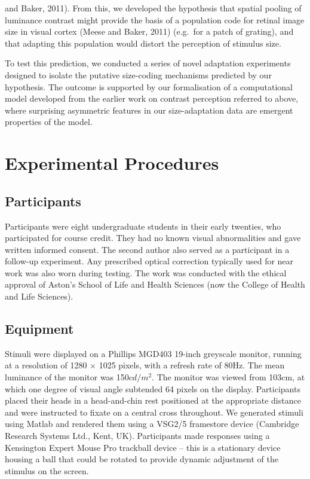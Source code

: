 \documentclass[
]{article}
\begin{document}
and Baker, 2011). From this, we developed the hypothesis that spatial pooling of luminance contrast might provide the basis of a population code for retinal image size in visual cortex (Meese and Baker, 2011) (e.g.~for a patch of grating), and that adapting this population would distort the perception of stimulus size.

To test this prediction, we conducted a series of novel adaptation experiments designed to isolate the putative size-coding mechanisms predicted by our hypothesis. The outcome is supported by our formalisation of a computational model developed from the earlier work on contrast perception referred to above, where surprising asymmetric features in our size-adaptation data are emergent properties of the model.

\hypertarget{experimental-procedures}{%
\section*{Experimental Procedures}\label{experimental-procedures}}

\hypertarget{participants}{%
\subsection*{Participants}\label{participants}}

Participants were eight undergraduate students in their early twenties, who participated for course credit. They had no known visual abnormalities and gave written informed consent. The second author also served as a participant in a follow-up experiment. Any prescribed optical correction typically used for near work was also worn during testing. The work was conducted with the ethical approval of Aston's School of Life and Health Sciences (now the College of Health and Life Sciences).

\hypertarget{equipment}{%
\subsection*{Equipment}\label{equipment}}

Stimuli were displayed on a Phillips MGD403 19-inch greyscale monitor, running at a resolution of 1280 \(\times\) 1025 pixels, with a refresh rate of 80Hz. The mean luminance of the monitor was 150\(cd/m^2\). The monitor was viewed from 103cm, at which one degree of visual angle subtended 64 pixels on the display. Participants placed their heads in a head-and-chin rest positioned at the appropriate distance and were instructed to fixate on a central cross throughout. We generated stimuli using Matlab and rendered them using a VSG2/5 framestore device (Cambridge Research Systems Ltd., Kent, UK). Participants made responses using a Kensington Expert Mouse Pro trackball device -- this is a stationary device housing a ball that could be rotated to provide dynamic adjustment of the stimulus on the screen.
\end{document}

